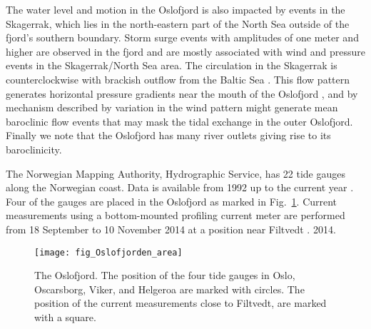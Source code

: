 The water level and motion in the Oslofjord is also impacted by events in the Skagerrak, which lies in the north-eastern part of the North Sea outside of the fjord's southern boundary. Storm surge events with amplitudes of one meter and higher are observed in the fjord and are mostly associated with wind and pressure events in the Skagerrak/North Sea area. The circulation in the Skagerrak is counterclockwise with brackish outflow from the Baltic Sea \cite[]{rodhe96,svendsen96}. This flow pattern generates horizontal pressure gradients near the mouth of the Oslofjord \cite[]{baals90}, and by mechanism described by \cite{klinck81} variation in the wind pattern might generate mean baroclinic flow events that may mask the tidal exchange in the outer Oslofjord.
Finally we note that the Oslofjord has many river outlets giving rise to its baroclinicity. 

The Norwegian Mapping Authority, Hydrographic Service, has 22 tide gauges along the Norwegian coast. Data is available from 1992 up to the current year \cite[]{tide16}. Four of the gauges are placed in the Oslofjord as marked in  Fig.~\ref{fig:area1}.
Current measurements using a bottom-mounted profiling current meter are performed from 18 September to 10 November 2014 at a position near Filtvedt \cite[]{hjelmervik17}.
2014.

\begin{figure}[htb]
\centering
\texttt{[image: fig\_Oslofjorden\_area]}
\caption{The Oslofjord. The position of the four tide gauges in Oslo, Oscarsborg, Viker, and Helgeroa are marked with circles. The position of the current measurements close to Filtvedt, are marked with a square.}
\label{fig:area1}
\end{figure}

